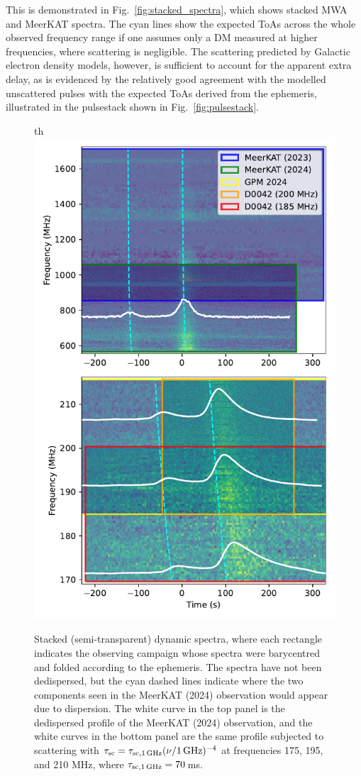 \documentclass[fleqn,usenatbib]{mnras}
\newcommand{\Fig}{Fig.}
\begin{document}
This is demonstrated in \Fig~\ref{fig:stacked_spectra}, which shows stacked MWA and MeerKAT spectra.
The cyan lines show the expected ToAs across the whole observed frequency range if one assumes only a DM measured at higher frequencies, where scattering is negligible.
The scattering predicted by Galactic electron density models, however, is sufficient to account for the apparent extra delay, as is evidenced by the relatively good agreement with the modelled unscattered pulses with the expected ToAs derived from the ephemeris, illustrated in the pulsestack shown in \Fig~\ref{fig:pulsestack}.

\begin{figure}{th}
      \centering
          \includegraphics[width=0.95\linewidth]{stacked_spectra.pdf}
              \caption{Stacked (semi-transparent) dynamic spectra, where each rectangle indicates the observing campaign whose spectra were barycentred and folded according to the ephemeris. The spectra have not been dedispersed, but the cyan dashed lines indicate where the two components seen in the MeerKAT (2024) observation would appear due to dispersion. The white curve in the top panel is the dedispersed profile of the MeerKAT (2024) observation, and the white curves in the bottom panel are the same profile subjected to scattering with $\tau_{\rm sc} = \tau_{\rm sc,1\,GHz} (\nu/{\rm 1\,GHz})^{-4}$ at frequencies 175, 195, and 210 MHz, where $\tau_{\rm sc,1\,GHz} = 70$\,ms.}

\end{figure}
\end{document}
